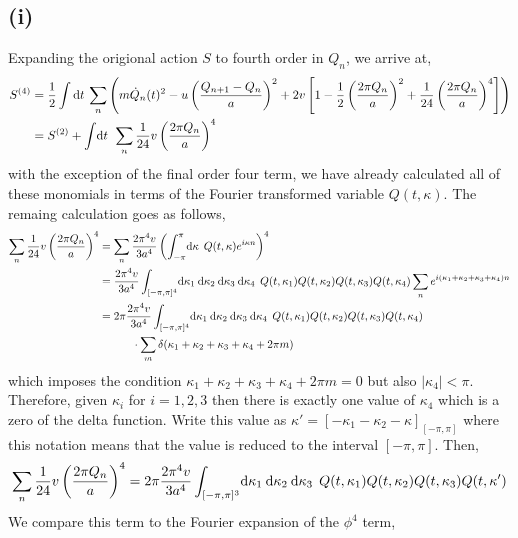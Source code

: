 \documentclass[12pt]{extarticle}
\begin{document}
\subsection*{(i)}
Expanding the origional action $S$ to fourth order in $Q_n$, we arrive at,
\begin{align*} S^{(4)} & = \frac{1}{2} \int \mathrm{d}t \: \sum_{n} \left(m \dot{Q}_n(t)^2 - u \left(\frac{Q_{n+1} - Q_{n}}{a}\right)^2 + 2 v \left[1 - \frac{1}{2} \left(\frac{2 \pi Q_n}{a} \right)^2 + \frac{1}{24} \left(\frac{2 \pi Q_n}{a} \right)^4 \right] \right) \\
& = S^{(2)} + \int \! \mathrm{d}t \: \: \sum_{n} \frac{1}{24} v \left(\frac{2 \pi Q_n}{a} \right)^4
\end{align*}
with the exception of the final order four term, we have already calculated all of these  monomials in terms of the Fourier transformed variable $Q(t, \kappa)$. The remaing calculation goes as follows,
\begin{align*}
\sum_{n} \frac{1}{24} v \left(\frac{2 \pi Q_n}{a} \right)^4 & = \sum_n \frac{2 \pi^4 v}{3 a^4} \left( \int_{-\pi}^{\pi} \! \mathrm{d}\kappa \: \: Q(t, \kappa) e^{i \kappa n} \right)^4 \\ & = \frac{2 \pi^4 v}{3 a^4} \int_{[-\pi, \pi]^4} \! \mathrm{d}\kappa_1 \: \mathrm{d}\kappa_2 \: \mathrm{d}\kappa_3 \: \mathrm{d}\kappa_4 \: \: Q(t, \kappa_1) Q(t, \kappa_2) Q(t, \kappa_3) Q(t, \kappa_4) \sum_{n} e^{i (\kappa_1 + \kappa_2 + \kappa_3 + \kappa_4) n} \\
& = 2\pi \frac{2 \pi^4 v}{3 a^4} \int_{[-\pi, \pi]^4} \! \mathrm{d}\kappa_1 \: \mathrm{d}\kappa_2 \: \mathrm{d}\kappa_3 \: \mathrm{d}\kappa_4 \: \: Q(t, \kappa_1) Q(t, \kappa_2) Q(t, \kappa_3) Q(t, \kappa_4) \\ & \quad \quad \quad \cdot \sum_{m} \delta(\kappa_1 + \kappa_2 + \kappa_3 + \kappa_4 + 2 \pi m)
\end{align*}
which imposes the condition $\kappa_1 + \kappa_2 + \kappa_3 + \kappa_4 + 2 \pi m = 0$ but also $|\kappa_4| < \pi$. Therefore, given $\kappa_i$ for $i = 1,2,3$ then there is exactly one value of $\kappa_4$ which is a zero of the delta function. Write this value as $\kappa' = [-\kappa_1 - \kappa_2 - \kappa]_{[-\pi, \pi]}$ where this notation means that the value is reduced to the interval $[-\pi, \pi]$. Then,
\begin{align*}
\sum_{n} \frac{1}{24} v \left(\frac{2 \pi Q_n}{a} \right)^4 = 2\pi \frac{2 \pi^4 v}{3 a^4} \int_{[-\pi, \pi]^3} \! \mathrm{d}\kappa_1 \: \mathrm{d}\kappa_2 \: \mathrm{d}\kappa_3 \:  \: Q(t, \kappa_1) Q(t, \kappa_2) Q(t, \kappa_3) Q(t, \kappa')
\end{align*}
We compare this term to the Fourier expansion of the $\phi^4$ term,
\end{document}
